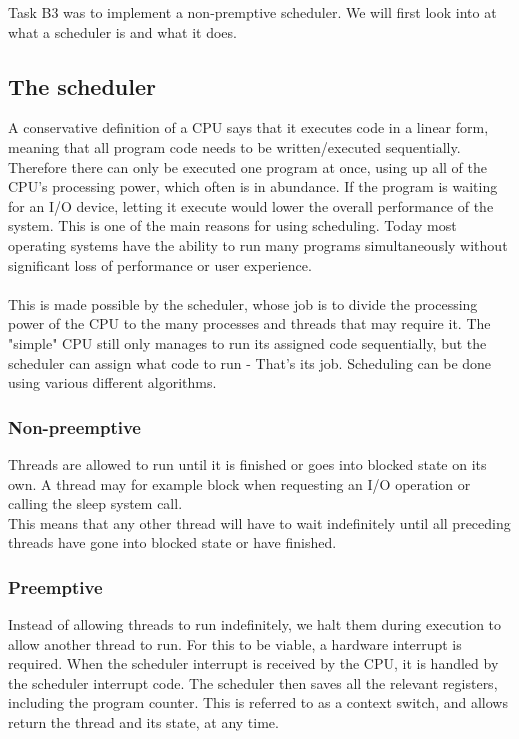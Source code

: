Task B3 was to implement a non-premptive scheduler. We will first look into at what a scheduler is and what it does.

\subsection{The scheduler}
A conservative definition of a CPU says that it executes code in a linear form, meaning that all program code needs to be written/executed sequentially. Therefore there can only be executed one program at once, using up all of the CPU's processing power, which often is in abundance. If the program is waiting for an I/O device, letting it execute would lower the overall performance of the system. This is one of the main reasons for using scheduling. Today most operating systems have the ability to run many programs simultaneously without significant loss of performance or user experience.\\
\\
This is made possible by the scheduler, whose job is to divide the processing power of the CPU to the many processes and threads that may require it. The "simple" CPU still only manages to run its assigned code sequentially, but the scheduler can assign what code to run - That's its job. Scheduling can be done using various different algorithms.

\subsubsection{Non-preemptive}
Threads are allowed to run until it is finished or goes into blocked state on its own. A thread may for example block when requesting an I/O operation or calling the sleep system call.
\\
This means that any other thread will have to wait indefinitely until all preceding threads have gone into blocked state or have finished. 

\subsubsection{Preemptive}
Instead of allowing threads to run indefinitely, we halt them during execution to allow another thread to run. For this to be viable, a hardware interrupt is required. When the scheduler interrupt is received by the CPU, it is handled by the scheduler interrupt code. The scheduler then saves all the relevant registers, including the program counter. This is referred to as a context switch, and allows return the thread and its state, at any time.

